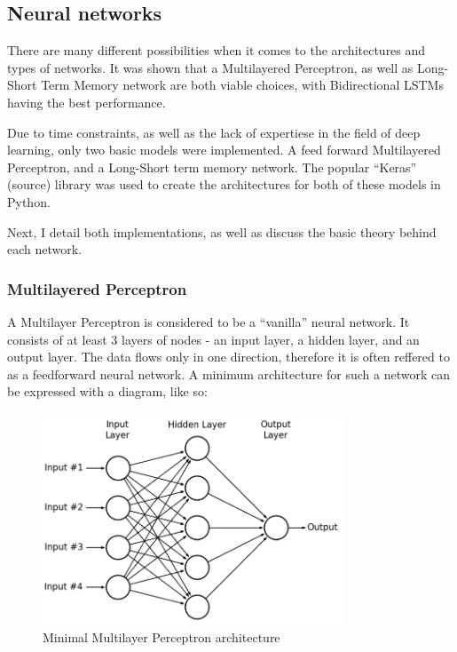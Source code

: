 \subsection{Neural networks}

There are many different possibilities when it comes to
the architectures and types of networks. It was shown that a
Multilayered Perceptron, as well as Long-Short Term Memory network are
both viable choices, with Bidirectional LSTMs having the best
performance\cite{yee-king_automatic_2018}.

Due to time constraints, as well as the lack of expertiese in the
field of deep learning, only two basic models were implemented. A feed
forward Multilayered Perceptron, and a Long-Short term memory
network. The popular ``Keras'' (source) library was used to create the
architectures for both of these models in Python.

Next, I detail both implementations, as well as discuss the basic
theory behind each network.  

\subsubsection{Multilayered Perceptron}

A Multilayer Perceptron is considered to be a ``vanilla'' neural
network. It consists of at least 3 layers of nodes - an input layer, a
hidden layer, and an output layer. The data flows only in one
direction, therefore it is often reffered to as a feedforward neural
network. A minimum architecture for such a network can be expressed
with a diagram, like so:

\begin{figure}[!h]
\caption{Minimal Multilayer Perceptron architecture}
\centering
\includegraphics[width=0.8\textwidth]{images/MLP}
\end{figure}

